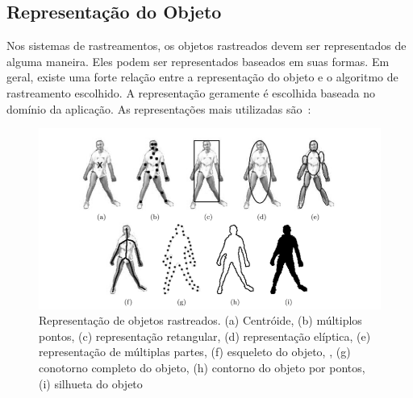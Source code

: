 \subsection{Representação do Objeto}

	Nos sistemas de rastreamentos, os objetos rastreados devem ser representados de alguma maneira. Eles podem ser representados baseados em suas formas. Em geral, existe uma forte relação entre a representação do objeto e o algoritmo de rastreamento escolhido. A representação geramente é escolhida baseada no domínio da aplicação. As representações mais utilizadas são~\cite{yilmaz}:

	\begin{figure}[hbt]
		\begin{center}
			\includegraphics[scale=0.5]{figuras/2.FundamentacaoTeorica/representacao.png}
		\end{center}
		\caption{Representação de objetos rastreados. (a) Centróide, (b) múltiplos pontos, (c) representação retangular, (d) representação elíptica, (e) representação de múltiplas partes, (f) esqueleto do objeto, , (g) conotorno completo do objeto, (h) contorno do objeto por pontos, (i) silhueta do objeto~\cite{yilmaz}}
		\label{representacao}
	\end{figure}

